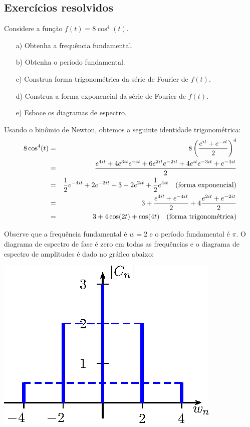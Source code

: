 \subsection*{Exercícios resolvidos}
\begin{exeresol}

  Considere a função $f(t)=8\cos^4(t)$. 

\begin{itemize}
 \item[a)] Obtenha a frequência fundamental.
 \item[b)] Obtenha o período fundamental.
 \item[c)] Construa forma trigonométrica da série de Fourier de $f(t)$.
 \item[d)] Construa a forma exponencial da série de Fourier de $f(t)$.
 \item[e)] Esboce os diagramas de espectro.
\end{itemize}
\begin{resol}
Usando o binômio de Newton, obtemos a seguinte identidade trigonométrica:
\begin{eqnarray*}
8\cos^4(t)&=&8\left(\frac{e^{it}+e^{-it}}{2}\right)^4\\
&=&\frac{e^{4it}+ 4 e^{3it}e^{-it}+ 6 e^{2it}e^{-2it}+ 4 e^{it}e^{-3it} +e^{-4it} }{2} \\
&=&\frac{1}{2}e^{-4it}+2 e^{-2it}+3  + 2 e^{2it} +\frac{1}{2}e^{4it} \quad \hbox{(forma exponencial)}\\
&=&3+\frac{e^{4it}+e^{-4it} }{2}+4\frac{  e^{2it}+  e^{-2it} }{2}\\
&=&3+4\cos(2t)+\cos(4t)\quad \hbox{(forma trigonométrica)}\\
\end{eqnarray*}

Observe que a frequência fundamental é $w=2$ e o período fundamental é $\pi$. O diagrama de espectro de fase é zero em todas as frequências e o diagrama de espectro de amplitudes é dado no gráfico abaixo:

\begin{center}
  \includegraphics{cap_diagramas_espectro/pics/diagrama_3}
\end{center}
\end{resol}


\end{exeresol}

